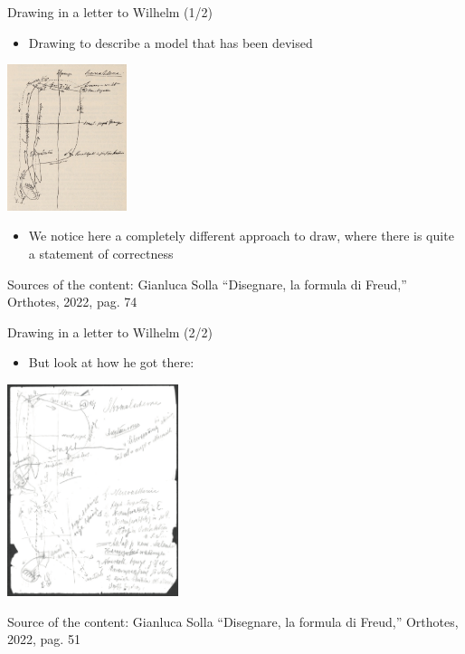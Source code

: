 \documentclass{beamer}
\begin{document}
\begin{frame}
{\centerline{Drawing in a letter to Wilhelm (1/2)}}

\begin{itemize}
   \item Drawing to describe a model that has been devised
 \end{itemize} 


\begin{center}
 \includegraphics[width=3.5cm]{P2023.AIBCCSS.Drawing/schematizzazione.jpg}
 
 \end{center}

\begin{itemize}
   \item We notice here a completely different approach to draw, where there is quite a statement of correctness
 \end{itemize} 

\begin{center}
\tiny
Sources of the content: Gianluca Solla ``Disegnare, la formula di Freud,'' Orthotes, 2022, pag. 74
\end{center}
\end{frame}

\begin{frame}
{\centerline{Drawing in a letter to Wilhelm (2/2)}}

\begin{itemize}
   \item But look at how he got there:
 \end{itemize} 


\begin{center}
 \includegraphics[width=5cm]{P2023.AIBCCSS.Drawing/towardBuildingASchema.jpg}
 
 \end{center}


\begin{center}
\tiny
Source of the content: Gianluca Solla ``Disegnare, la formula di Freud,'' Orthotes, 2022, pag. 51
\end{center}
\end{frame}
\end{document}
